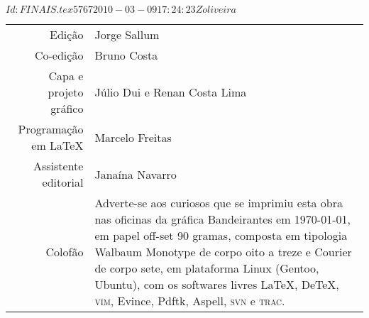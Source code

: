 \SVN $Id: FINAIS.tex 5767 2010-03-09 17:24:23Z oliveira $


\newcommand{\putline}[2]{#1 & #2\\}


\pagebreak

\noindent\begin{tabular}{rp{}}
\small
\putline{Edição}{Jorge Sallum}
		\putline{Co-edição}{Bruno Costa}
		\putline{Capa e projeto gráfico}{Júlio Dui e Renan Costa Lima}
		\putline{Programação em LaTeX}{Marcelo Freitas}
		\putline{Assistente editorial}{Janaína Navarro}
		\putline{Colofão}{Adverte-se aos curiosos que se
			imprimiu esta obra nas oficinas da gráfica
			Bandeirantes em \today, em papel 
			\mbox{off-set} 90 gramas,
			composta em tipologia Walbaum Monotype de 
			corpo oito a treze e Courier de corpo sete, 
			em plataforma Linux (Gentoo, Ubuntu), 
			com os softwares livres 
			\LaTeX, De\TeX, \textsc{vim}, Evince, Pdftk, 
			Aspell, \textsc{svn} e \textsc{trac}.}
\end{tabular}

